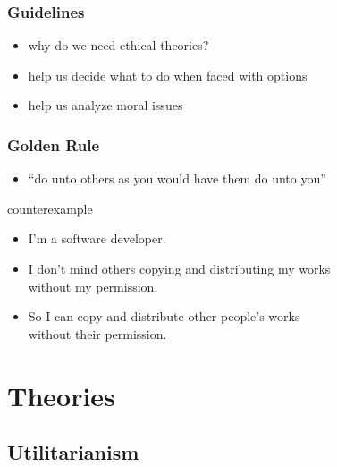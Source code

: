 \documentclass[dvipsnames]{beamer}
\theoremstyle{plain}
\begin{document}
\begin{frame}
  \frametitle{Guidelines}

  \begin{itemize}
    \item why do we need ethical theories?

    \medskip
    \item help us decide what to do when faced with options
    \item help us analyze moral issues
  \end{itemize}
\end{frame}

\begin{frame}
  \frametitle{Golden Rule}

  \begin{itemize}
    \item ``do unto others as you would have them do unto you''
  \end{itemize}

  \pause
  \medskip
  \begin{exampleblock}{counterexample}
    \begin{itemize}
      \item I'm a software developer.
      \item I don't mind others copying and distributing my works\\
        without my permission.
      \item So I can copy and distribute other people's works\\
        without their permission.
    \end{itemize}
  \end{exampleblock}
\end{frame}

\section{Theories}

\subsection{Utilitarianism}
\end{document}
